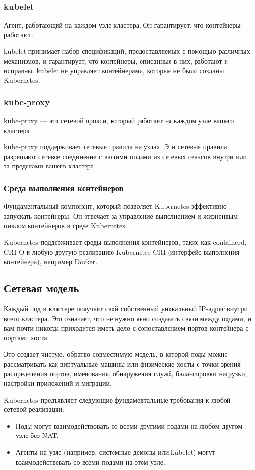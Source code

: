 \documentclass[a4page]{article}
\begin{document}
\subsubsection{kubelet}
Агент, работающий на каждом узле кластера. Он гарантирует, что контейнеры работают.

kubelet принимает набор спецификаций, предоставляемых с помощью различных механизмов, и гарантирует, что контейнеры, описанные в них, работают и исправны. kubelet не управляет контейнерами, которые не были созданы Kubernetes.

\subsubsection{kube-proxy}
kube-proxy --- это сетевой прокси, который работает на каждом узле вашего кластера.

kube-proxy поддерживает сетевые правила на узлах. Эти сетевые правила разрешают сетевое соединение с вашими подами из сетевых сеансов внутри или за пределами вашего кластера.

\subsubsection{Среда выполнения контейнеров}
Фундаментальный компонент, который позволяет Kubernetes эффективно \\запускать контейнеры. Он отвечает за управление выполнением и жизненным циклом контейнеров в среде Kubernetes.

Kubernetes поддерживает среды выполнения контейнеров, такие как containerd, CRI-O и любую другую реализацию Kubernetes CRI (интерфейс выполнения контейнера), например Docker.

\subsection{Сетевая модель}
Каждый под в кластере получает свой собственный уникальный IP-адрес внутри всего кластера. Это означает, что не нужно явно создавать связи между подами, и вам почти никогда приходится иметь дело с сопоставлением портов контейнера с портами хоста\cite{k8s:network-model}.

Это создает чистую, обратно совместимую модель, в которой поды можно рассматривать как виртуальные машины или физические хосты с точки зрения распределения портов, именования, обнаружения служб, балансировки нагрузки, настройки приложений и миграции.

Kubernetes предъявляет следующие фундаментальные требования к любой сетевой реализации:
\begin{itemize}
  \item Поды могут взаимодействовать со всеми другими подами на любом другом узле без NAT.
  \item Агенты на узле (например, системные демоны или kubelet) могут \\взаимодействовать со всеми подами на этом узле.
\end{itemize}
\end{document}
